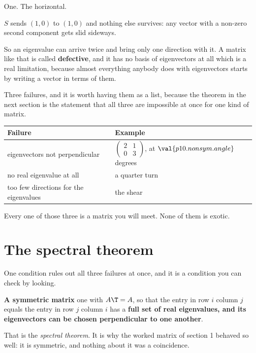 \begin{fr}
\begin{ansblock}
One. The horizontal.
\end{ansblock}

$S$ sends $(1, 0)$ to $(1, 0)$ and nothing else survives: any vector with a
non-zero second component gets slid sideways.

So an eigenvalue can arrive twice and bring only one direction with it. A
matrix like that is called \textbf{defective}, and it has no basis of
eigenvectors at all \dash{} which is a real limitation, because almost
everything anybody does with eigenvectors starts by writing a vector in terms
of them.
\end{fr}

\begin{fr}
Three failures, and it is worth having them as a list, because the theorem in
the next section is the statement that all three are impossible at once for one
kind of matrix.

\begin{center}
\begin{tabularx}{\linewidth}{@{}lX@{}}
\toprule
\textbf{Failure} & \textbf{Example} \\
\midrule
eigenvectors not perpendicular & $\begin{pmatrix} 2 & 1 \\ 0 & 3 \end{pmatrix}$,
  at $\val{p10.nonsym.angle}$ degrees \\
no real eigenvalue at all & a quarter turn \\
too few directions for the eigenvalues & the shear \\
\bottomrule
\end{tabularx}
\end{center}

Every one of those three is a matrix you will meet. None of them is exotic.
\end{fr}

\section{The spectral theorem}
\label{sec:P10-spectral}

\begin{fr}
One condition rules out all three failures at once, and it is a condition you
can check by looking.

\textbf{A symmetric matrix} \dash{} one with $A\T = A$, so that the entry in
row $i$ column $j$ equals the entry in row $j$ column $i$ \dash{} has a
\textbf{full set of real eigenvalues, and its eigenvectors can be chosen
perpendicular to one another}.

That is the \emph{spectral theorem}. It is why the worked matrix of section 1
behaved so well: it is symmetric, and nothing about it was a coincidence.
\end{fr}

